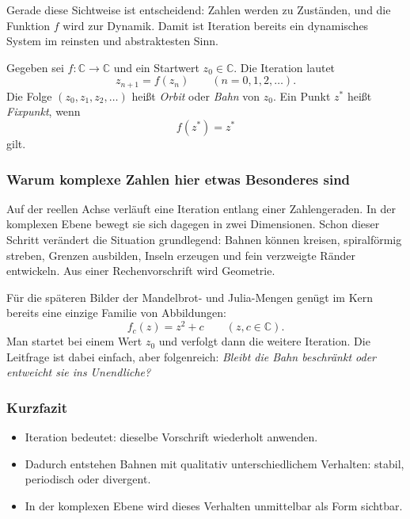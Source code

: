 Gerade diese Sichtweise ist entscheidend:
Zahlen werden zu Zuständen,
und die Funktion $f$ wird zur Dynamik.
Damit ist Iteration bereits ein dynamisches System
im reinsten und abstraktesten Sinn.

\begin{MathBox}
	\label{box:orbit}
	Gegeben sei $f:\mathbb{C}\to\mathbb{C}$ und ein Startwert $z_0\in\mathbb{C}$.
	Die Iteration lautet
	\[
	z_{n+1}=f(z_n)\qquad (n=0,1,2,\dots).
	\]
	Die Folge $(z_0,z_1,z_2,\dots)$ heißt \emph{Orbit} oder \emph{Bahn} von $z_0$.
	Ein Punkt $z^\ast$ heißt \emph{Fixpunkt}, wenn
	\[
	f(z^\ast)=z^\ast
	\]
	gilt.
\end{MathBox}

\subsubsection*{Warum komplexe Zahlen hier etwas Besonderes sind}

Auf der reellen Achse verläuft eine Iteration entlang einer Zahlengeraden.
In der komplexen Ebene bewegt sie sich dagegen in zwei Dimensionen.
Schon dieser Schritt verändert die Situation grundlegend:
Bahnen können kreisen,
spiralförmig streben,
Grenzen ausbilden,
Inseln erzeugen
und fein verzweigte Ränder entwickeln.
Aus einer Rechenvorschrift wird Geometrie.

Für die späteren Bilder der Mandelbrot- und Julia-Mengen
genügt im Kern bereits eine einzige Familie von Abbildungen:
\[
f_c(z)=z^2+c \qquad (z,c\in\mathbb{C}).
\]
Man startet bei einem Wert $z_0$
und verfolgt dann die weitere Iteration.
Die Leitfrage ist dabei einfach,
aber folgenreich:
\emph{Bleibt die Bahn beschränkt oder entweicht sie ins Unendliche?}

\subsubsection*{Kurzfazit}

\begin{itemize}
	\item Iteration bedeutet: dieselbe Vorschrift wiederholt anwenden.
	\item Dadurch entstehen Bahnen mit qualitativ unterschiedlichem Verhalten: stabil, periodisch oder divergent.
	\item In der komplexen Ebene wird dieses Verhalten unmittelbar als Form sichtbar.
\end{itemize}

